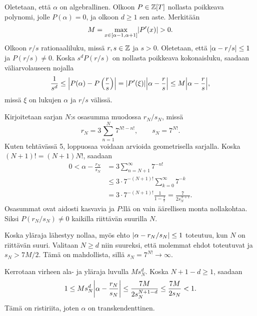 \documentclass[11pt,a4paper]{amsart}
\begin{document}
\begin{solution}
Oletetaan, että \(\alpha\) on algebrallinen. Olkoon \(P\in\mathbb{Z}[T]\)
nollasta poikkeava polynomi, jolle \(P(\alpha)=0\), ja olkoon \(d\ge 1\)
sen aste. Merkitään
\[
  M=\max_{x\in[\alpha-1,\alpha+1]}\lvert P'(x)\rvert>0.
\]
Olkoon \(r/s\) rationaaliluku, missä \(r,s\in\mathbb{Z}\) ja \(s>0\).
Oletetaan, että \(\lvert\alpha-r/s\rvert\le 1\) ja \(P(r/s)\ne 0\).
Koska \(s^dP(r/s)\) on nollasta poikkeava kokonaisluku, saadaan
väliarvolauseen nojalla
\[
  \frac{1}{s^d}
  \le \abs*{P(\alpha)-P\left(\frac{r}{s}\right)}
  = \abs{P'(\xi)}\abs*{\alpha-\frac{r}{s}}
  \le M\abs*{\alpha-\frac{r}{s}},
\]
missä \(\xi\) on lukujen \(\alpha\) ja \(r/s\) välissä.

Kirjoitetaan sarjan \(N\):s osasumma muodossa \(r_N/s_N\), missä
\[
  r_N=3\sum_{n=1}^{N}7^{N!-n!}, \qquad s_N=7^{N!}.
\]
Kuten tehtävässä 5, loppuosaa voidaan arvioida geometrisella sarjalla.
Koska \((N+1)!=(N+1)N!\), saadaan
\[
  \begin{aligned}
    0<\alpha-\frac{r_N}{s_N} &= 3\sum_{n=N+1}^{\infty}7^{-n!} \\
    &\le 3\cdot 7^{-(N+1)!}\sum_{k=0}^{\infty}7^{-k} \\
    &= 3\cdot 7^{-(N+1)!}\frac{1}{1-\frac{1}{7}}
    = \frac{7}{2s_N^{N+1}}.
  \end{aligned}
\]
Osasummat ovat aidosti kasvavia ja \(P\):llä on vain äärellisen monta
nollakohtaa. Siksi \(P(r_N/s_N)\ne 0\) kaikilla riittävän suurilla \(N\).

Koska yläraja lähestyy nollaa, myös ehto \(\lvert\alpha-r_N/s_N\rvert\le 1\)
toteutuu, kun \(N\) on riittävän suuri. Valitaan \(N\ge d\) niin suureksi,
että molemmat ehdot toteutuvat ja \(s_N>7M/2\). Tämä on mahdollista,
sillä \(s_N=7^{N!}\to\infty\).

Kerrotaan virheen ala- ja yläraja luvulla \(Ms_N^d\). Koska
\(N+1-d\ge 1\), saadaan
\[
  1\le Ms_N^d\abs*{\alpha-\frac{r_N}{s_N}}
  \le \frac{7M}{2s_N^{N+1-d}}
  \le \frac{7M}{2s_N}
  <1.
\]
Tämä on ristiriita, joten \(\alpha\) on transkendenttinen.
\end{solution}
\end{document}
